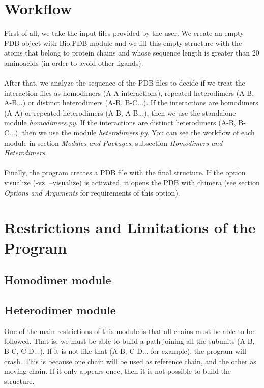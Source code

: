 \documentclass[a4paper,12pt]{report}
\begin{document}
\section{Workflow}

First of all, we take the input files provided by the user. We create an empty PDB object with Bio.PDB module and we fill this empty structure with the atoms that belong to protein chains and whose sequence length is greater than 20 aminoacids (in order to avoid other ligands). \\\\
After that, we analyze the sequence of the PDB files to decide if we treat the interaction files as homodimers (A-A interactions), repeated heterodimers (A-B, A-B...) or distinct heterodimers (A-B, B-C...).
If the interactions are homodimers (A-A) or repeated heterodimers (A-B, A-B...), then we use the standalone module \textit{homodimers.py}. If the interactions are distinct heterodimers (A-B, B-C...), then we use the module \textit{heterodimers.py}. You can see the workflow of each module in section \textit{Modules and Packages}, subsection \textit{Homodimers and Heterodimers}.\\\\
Finally, the program creates a PDB file with the final structure. If the option visualize (-vz, --visualize) is activated, it opens the PDB with chimera (see section \textit{Options and Arguments} for requirements of this option).

\section{Restrictions and Limitations of the Program}

\subsection{Homodimer module}

\subsection{Heterodimer module}

One of the main restrictions of this module is that all chains must be able to be followed. That is, we must be able to build a path joining all the subunits (A-B, B-C, C-D...). If it is not like that (A-B, C-D... for example), the program will crash. This is because one chain will be used as reference chain, and the other as moving chain. If it only appears once, then it is not possible to build the structure.
\end{document}
